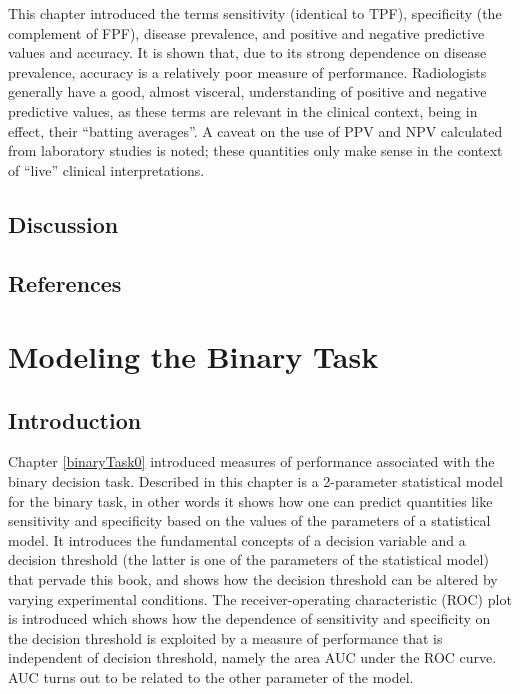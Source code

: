 \documentclass[
]{book}
\begin{document}
This chapter introduced the terms sensitivity (identical to TPF), specificity (the complement of FPF), disease prevalence, and positive and negative predictive values and accuracy. It is shown that, due to its strong dependence on disease prevalence, accuracy is a relatively poor measure of performance. Radiologists generally have a good, almost visceral, understanding of positive and negative predictive values, as these terms are relevant in the clinical context, being in effect, their ``batting averages''. A caveat on the use of PPV and NPV calculated from laboratory studies is noted; these quantities only make sense in the context of ``live'' clinical interpretations.

\hypertarget{binaryTask0-Discussion}{%
\section{Discussion}\label{binaryTask0-Discussion}}

\hypertarget{binaryTask0-references}{%
\section{References}\label{binaryTask0-references}}

\hypertarget{binaryTask}{%
\chapter{Modeling the Binary Task}\label{binaryTask}}

\hypertarget{binaryTaskIntro}{%
\section{Introduction}\label{binaryTaskIntro}}

Chapter \ref{binaryTask0} introduced measures of performance associated with the binary decision task. Described in this chapter is a 2-parameter statistical model for the binary task, in other words it shows how one can predict quantities like sensitivity and specificity based on the values of the parameters of a statistical model. It introduces the fundamental concepts of a decision variable and a decision threshold (the latter is one of the parameters of the statistical model) that pervade this book, and shows how the decision threshold can be altered by varying experimental conditions. The receiver-operating characteristic (ROC) plot is introduced which shows how the dependence of sensitivity and specificity on the decision threshold is exploited by a measure of performance that is independent of decision threshold, namely the area AUC under the ROC curve. AUC turns out to be related to the other parameter of the model.
\end{document}
